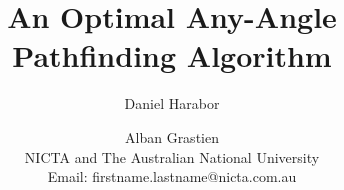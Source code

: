 \documentclass{article}
\begin{document}
\title{An Optimal Any-Angle Pathfinding Algorithm}
\author{
Daniel Harabor 
\and 
Alban Grastien \\
NICTA and The Australian National University \\
Email: firstname.lastname@nicta.com.au
}

\maketitle












\end{document}
